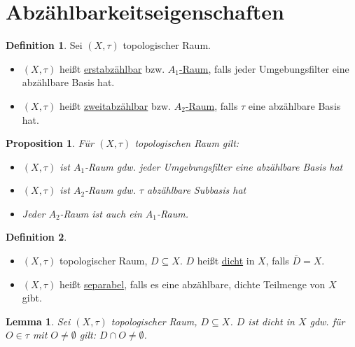 \documentclass[12pt]{scrartcl}%
\newtheorem{prop}{Proposition}
\newtheorem{lemma}{Lemma}
\theoremstyle{definition}
\newtheorem*{defn}{Definition}
\theoremstyle{remark}
\newcommand{\AR}[1]{$A_#1$-Raum}
\begin{document}
\section*{Abzählbarkeitseigenschaften}

\begin{defn}
    Sei $(X,\tau)$ topologischer Raum.

    \begin{itemize}
        \item $(X,\tau)$ heißt \underline{erstabzählbar} bzw. \underline{\AR{1}}, falls jeder Umgebungsfilter eine abzählbare Basis hat.
        \item $(X,\tau)$ heißt \underline{zweitabzählbar} bzw. \underline{\AR{2}}, falls $\tau$ eine abzählbare Basis hat.
    \end{itemize}
\end{defn}

\begin{prop}
    Für $(X,\tau)$ topologischen Raum gilt:

    \begin{itemize}
        \item $(X,\tau)$ ist \AR{1} gdw. jeder Umgebungsfilter eine abzählbare Basis hat
        \item $(X,\tau)$ ist \AR{2} gdw. $\tau$ abzählbare Subbasis hat
        \item Jeder \AR{2} ist auch ein \AR{1}.
    \end{itemize}
\end{prop}

\begin{defn}
    \begin{itemize}
        \item $(X,\tau)$ topologischer Raum, $D\subseteq X$. $D$ heißt \underline{dicht} in $X$, falls $\overline{D}=X$.
        \item $(X,\tau)$ heißt \underline{separabel}, falls es eine abzählbare, dichte Teilmenge von $X$ gibt.
    \end{itemize}
\end{defn}

\begin{lemma}
    Sei $(X,\tau)$ topologischer Raum, $D\subseteq X$. $D$ ist dicht in $X$ gdw. für $O\in \tau$ mit $O\neq \emptyset$ gilt: $D\cap O \neq \emptyset$.
\end{lemma}
\end{document}
